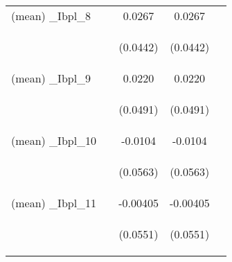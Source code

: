 \documentclass[]{article}
\begin{document}
\begin{center}
\begin{tabular}{lcccc}
(mean) \_Ibpl\_8 &  & 0.0267 & 0.0267 &  \\
\vspace{4pt} & \begin{footnotesize}\end{footnotesize} & \begin{footnotesize}(0.0442)\end{footnotesize} & \begin{footnotesize}(0.0442)\end{footnotesize} & \begin{footnotesize}\end{footnotesize} \\
(mean) \_Ibpl\_9 &  & 0.0220 & 0.0220 &  \\
\vspace{4pt} & \begin{footnotesize}\end{footnotesize} & \begin{footnotesize}(0.0491)\end{footnotesize} & \begin{footnotesize}(0.0491)\end{footnotesize} & \begin{footnotesize}\end{footnotesize} \\
(mean) \_Ibpl\_10 &  & -0.0104 & -0.0104 &  \\
\vspace{4pt} & \begin{footnotesize}\end{footnotesize} & \begin{footnotesize}(0.0563)\end{footnotesize} & \begin{footnotesize}(0.0563)\end{footnotesize} & \begin{footnotesize}\end{footnotesize} \\
(mean) \_Ibpl\_11 &  & -0.00405 & -0.00405 &  \\
\vspace{4pt} & \begin{footnotesize}\end{footnotesize} & \begin{footnotesize}(0.0551)\end{footnotesize} & \begin{footnotesize}(0.0551)\end{footnotesize} & \begin{footnotesize}\end{footnotesize} \\

\end{tabular}
\end{center}
\end{document}
